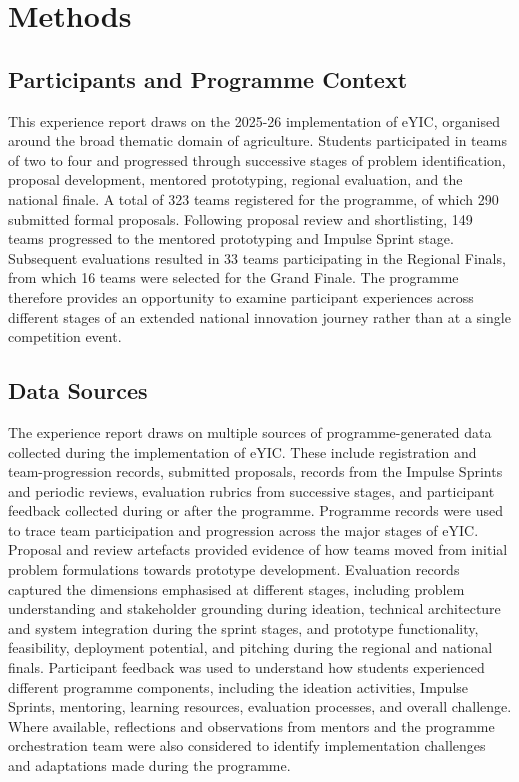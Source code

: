 \documentclass[runningheads]{llncs}
\begin{document}
\section{Methods}

\subsection{Participants and Programme Context}

This experience report draws on the 2025-26 implementation of eYIC, organised around the broad thematic domain of agriculture. Students participated in teams of two to four and progressed through successive stages of problem identification, proposal development, mentored prototyping, regional evaluation, and the national finale. A total of 323 teams registered for the programme, of which 290 submitted formal proposals. Following proposal review and shortlisting, 149 teams progressed to the mentored prototyping and Impulse Sprint stage. Subsequent evaluations resulted in 33 teams participating in the Regional Finals, from which 16 teams were selected for the Grand Finale. The programme therefore provides an opportunity to examine participant experiences across different stages of an extended national innovation journey rather than at a single competition event.

\subsection{Data Sources}

The experience report draws on multiple sources of programme-generated data collected during the implementation of eYIC. These include registration and team-progression records, submitted proposals, records from the Impulse Sprints and periodic reviews, evaluation rubrics from successive stages, and participant feedback collected during or after the programme. Programme records were used to trace team participation and progression across the major stages of eYIC. Proposal and review artefacts provided evidence of how teams moved from initial problem formulations towards prototype development. Evaluation records captured the dimensions emphasised at different stages, including problem understanding and stakeholder grounding during ideation, technical architecture and system integration during the sprint stages, and prototype functionality, feasibility, deployment potential, and pitching during the regional and national finals. Participant feedback was used to understand how students experienced different programme components, including the ideation activities, Impulse Sprints, mentoring, learning resources, evaluation processes, and overall challenge. Where available, reflections and observations from mentors and the programme orchestration team were also considered to identify implementation challenges and adaptations made during the programme.
\end{document}
